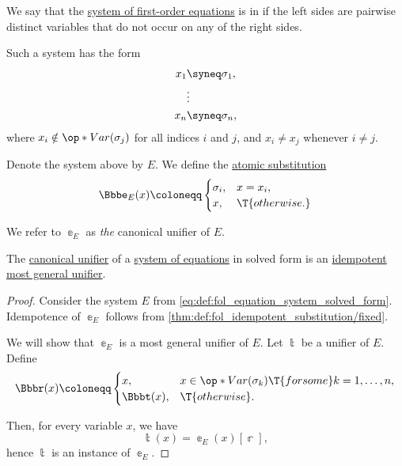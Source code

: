 \begin{definition}\label{def:fol_equation_system_solved_form}
  We say that the \hyperref[def:fol_equation/system]{system of first-order equations} is in  if the left sides are pairwise distinct variables that do not occur on any of the right sides.

  Such a system has the form
  \begin{equation}\label{eq:def:fol_equation_system_solved_form}
    \begin{aligned}
      x_1 &\syneq \sigma_1, \\
          &\vdots \\
      x_n &\syneq \sigma_n,
    \end{aligned}
  \end{equation}
  where \( x_i \notin \op*{Var}(\sigma_j) \) for all indices \( i \) and \( j \), and \( x_i \neq x_j \) whenever \( i \neq j \).

  Denote the system above by \( E \). We define the \hyperref[def:atomic_fol_substitution]{atomic substitution}
  \begin{equation*}
    \Bbbe_E(x) \coloneqq \begin{cases}
      \sigma_i, &x = x_i, \\
      x,        &\T{otherwise.}
    \end{cases}
  \end{equation*}

  We refer to \( \Bbbe_E \) as \emph{the} canonical unifier of \( E \).
\end{definition}

\begin{proposition}\label{thm:fol_canonical_unifier_is_most_general}
  The \hyperref[def:fol_equation_system_solved_form]{canonical unifier} of a \hyperref[def:fol_equation/system]{system of equations} in solved form is an \hyperref[def:fol_idempotent_substitution]{idempotent} \hyperref[def:fol_most_general_unifier]{most general unifier}.
\end{proposition}
\begin{proof}
  Consider the system \( E \) from \eqref{eq:def:fol_equation_system_solved_form}. Idempotence of \( \Bbbe_E \) follows from \cref{thm:def:fol_idempotent_substitution/fixed}.

  We will show that \( \Bbbe_E \) is a most general unifier of \( E \). Let \( \Bbbt \) be a unifier of \( E \). Define
  \begin{equation*}
    \Bbbr(x) \coloneqq \begin{cases}
      x,        &x \in \op*{Var}(\sigma_k) \T{for some} k = 1, \ldots, n, \\
      \Bbbt(x), &\T{otherwise}.
    \end{cases}
  \end{equation*}

  Then, for every variable \( x \), we have
  \begin{equation*}
    \Bbbt(x) = \Bbbe_E(x)[\Bbbr],
  \end{equation*}
  hence \( \Bbbt \) is an instance of \( \Bbbe_E \).
\end{proof}

